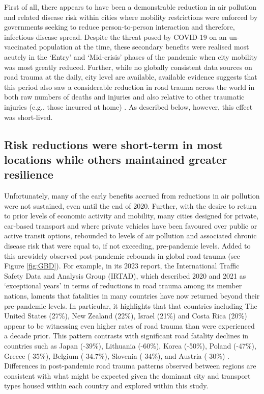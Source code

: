 \documentclass[preprint,10pt]{elsarticle} %
\begin{document}
First of all, there appears to have been a demonstrable reduction in air pollution and related disease risk within cities where mobility restrictions were enforced by governments seeking to reduce person-to-person interaction and therefore, infectious disease spread. Despite the threat posed by COVID-19 on an un-vaccinated population at the time, these secondary benefits were realised most acutely in the `Entry' and `Mid-crisis' phases of the pandemic when city mobility was most greatly reduced. Further, while no globally consistent data sources on road trauma at the daily, city level are available, available evidence suggests that this period also saw a considerable reduction in road trauma across the world in both raw numbers of deaths and injuries \cite{saladie2023back,ITFRS2022,ITFRS2023,GBDStudy} and also relative to other traumatic injuries (e.g., those incurred at home) \cite{WASEEM2021200}. As described below, however, this effect was short-lived.

\subsection*{Risk reductions were short-term in most locations while others maintained greater resilience}
Unfortunately, many of the early benefits accrued from reductions in air pollution were not sustained, even until the end of 2020. Further, with the desire to return to prior levels of economic activity and mobility, many cities designed for private, car-based transport and where private vehicles have been favoured over public or active transit options\cite{DAS20211}, rebounded to levels of air pollution and associated chronic disease risk that were equal to, if not exceeding, pre-pandemic levels. Added to this arewidely observed post-pandemic rebounds in global road trauma (see Figure \ref{fig:GBD}). For example, in its 2023 report, the International Traffic Safety Data and Analysis Group (IRTAD), which described 2020 and 2021 as `exceptional years' in terms of reductions in road trauma among its member nations, laments that fatalities in many countries have now returned beyond their pre-pandemic levels. In particular, it highlights that that countries including The United States (27\%), New Zealand (22\%), Israel (21\%) and Costa Rica (20\%) appear to be witnessing even higher rates of road trauma than were experienced a decade prior. This pattern contrasts with significant road fatality declines in countries such as Japan (-39\%), Lithuania (-60\%), Korea (-50\%), Poland (-47\%), Greece (-35\%), Belgium (-34.7\%), Slovenia (-34\%), and Austria (-30\%) \cite{ITFRS2022,ITFRS2023}. Differences in post-pandemic road trauma patterns observed between regions are consistent with what might be expected given the dominant city and transport types housed within each country and explored within this study.
\end{document}
